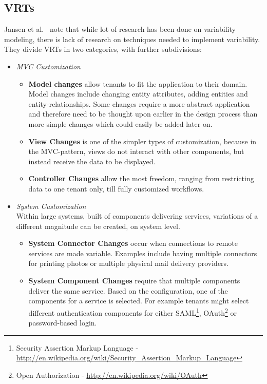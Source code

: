 \subsection{\aclp{VRT}}
\label{sec:vrt}
Jansen et al.~\cite{jansen2010customization} note that while lot of research has been done on variability modeling, there is lack of research on techniques needed to implement variability. They divide \acp{VRT} in two categories, with further subdivisions:
\begin{itemize}
\item \textit{\ac{MVC} Customization}
\begin{itemize}
\item \textbf{Model changes} allow tenants to fit the application to their domain. Model changes include changing entity attributes, adding entities and entity-relationships. Some changes require a more abstract application and therefore need to be thought upon earlier in the design process than more simple changes which could easily be added later on.
\item \textbf{View Changes} is one of the simpler types of customization, because in the \ac{MVC}-pattern, views do not interact with other components, but instead receive the data to be displayed.
\item \textbf{Controller Changes} allow the most freedom, ranging from restricting data to one tenant only, till fully customized workflows.
\end{itemize}
\item \textit{System Customization} \\ Within large systems, built of components delivering services, variations of a different magnitude can be created, on system level.
\begin{itemize}
\item \textbf{System Connector Changes} occur when connections to remote services are made variable. Examples include having multiple connectors for printing photos or multiple physical mail delivery providers.
\item \textbf{System Component Changes} require that multiple components deliver the same service. Based on the configuration, one of the components for a service is selected. For example tenants might select different authentication components for either SAML\footnote{Security Assertion Markup Language - \url{http://en.wikipedia.org/wiki/Security_Assertion_Markup_Language}}, OAuth\footnote{Open Authorization - \url{http://en.wikipedia.org/wiki/OAuth}} or password-based login.
\end{itemize}
\end{itemize}

